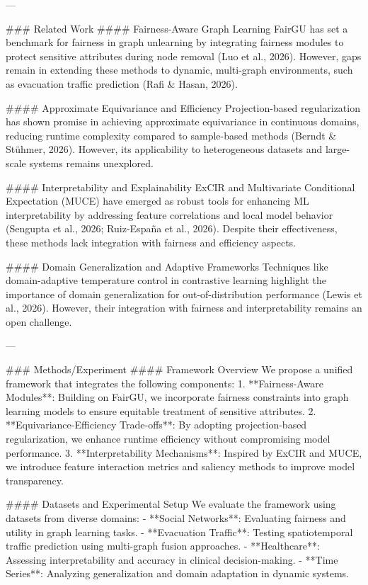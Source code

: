 ---

### Related Work  
#### Fairness-Aware Graph Learning  
FairGU has set a benchmark for fairness in graph unlearning by integrating fairness modules to protect sensitive attributes during node removal (Luo et al., 2026). However, gaps remain in extending these methods to dynamic, multi-graph environments, such as evacuation traffic prediction (Rafi & Hasan, 2026).

#### Approximate Equivariance and Efficiency  
Projection-based regularization has shown promise in achieving approximate equivariance in continuous domains, reducing runtime complexity compared to sample-based methods (Berndt & Stühmer, 2026). However, its applicability to heterogeneous datasets and large-scale systems remains unexplored.

#### Interpretability and Explainability  
ExCIR and Multivariate Conditional Expectation (MUCE) have emerged as robust tools for enhancing ML interpretability by addressing feature correlations and local model behavior (Sengupta et al., 2026; Ruiz-España et al., 2026). Despite their effectiveness, these methods lack integration with fairness and efficiency aspects.

#### Domain Generalization and Adaptive Frameworks  
Techniques like domain-adaptive temperature control in contrastive learning highlight the importance of domain generalization for out-of-distribution performance (Lewis et al., 2026). However, their integration with fairness and interpretability remains an open challenge.

---

### Methods/Experiment  
#### Framework Overview  
We propose a unified framework that integrates the following components:  
1. **Fairness-Aware Modules**: Building on FairGU, we incorporate fairness constraints into graph learning models to ensure equitable treatment of sensitive attributes.
2. **Equivariance-Efficiency Trade-offs**: By adopting projection-based regularization, we enhance runtime efficiency without compromising model performance.
3. **Interpretability Mechanisms**: Inspired by ExCIR and MUCE, we introduce feature interaction metrics and saliency methods to improve model transparency.

#### Datasets and Experimental Setup  
We evaluate the framework using datasets from diverse domains:  
- **Social Networks**: Evaluating fairness and utility in graph learning tasks.  
- **Evacuation Traffic**: Testing spatiotemporal traffic prediction using multi-graph fusion approaches.  
- **Healthcare**: Assessing interpretability and accuracy in clinical decision-making.  
- **Time Series**: Analyzing generalization and domain adaptation in dynamic systems.

